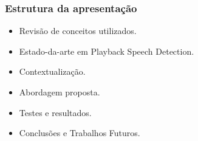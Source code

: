 \begin{frame}
	\frametitle{Estrutura da apresentação}
	\begin{itemize}
		\item Revisão de conceitos utilizados.
		\item Estado-da-arte em Playback Speech Detection.
		\item Contextualização.
		\item Abordagem proposta.
		\item Testes e resultados.
		\item Conclusões e Trabalhos Futuros.
	\end{itemize}
\end{frame}